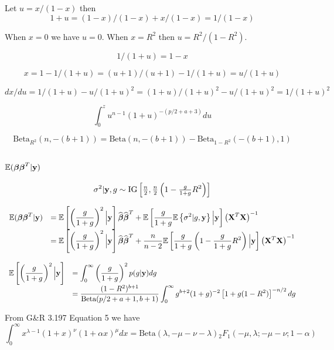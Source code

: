 \documentclass{article}
\def\vectorfontone{\bf}
\def\vectorfonttwo{\boldsymbol}
\def\vy{{\vectorfontone y}}                      %
\def\vbeta{{\vectorfonttwo \beta}}               %
\def\matrixfontone{\bf}
\def\mX{{\matrixfontone X}}                      %
\def\bE{{\mathbb E}}                             %
\def\ds{\displaystyle}
\theoremstyle{definition}
\begin{document}
Let $u = x/(1-x)$ then
$$
1 + u = (1 - x)/(1 - x) + x/(1-x) = 1/(1-x)
$$

\noindent When $x=0$ we have $u=0$. When $x=R^2$ then $u = R^2/(1-R^2)$.

$$
1/(1+u) = 1 - x
$$

$$
x = 1 -1/(1+u) = (u+1)/(u+1) -1/(1+u) = u/(1+u)
$$

$$
dx/du = 1/(1 + u) - u/(1+u)^2 = (1 + u)/(1 + u)^2 - u/(1+u)^2 = 1/(1 + u)^2
$$

$$
\int_{0}^{z} u^{n-1} (1 + u)^{-(p/2 + a + 3)}   du
$$


$$
\mbox{Beta}_{R^2}(n,-(b+1)) = \mbox{Beta}(n,-(b+1)) - \mbox{Beta}_{1-R^2}(-(b+1),1)
$$


\subsection{$\bE(\vbeta\vbeta^T|\vy)$}

$$
\sigma^2|\vy,g \sim \mbox{IG}\left[\tfrac{n}{2},\tfrac{n}{2}\left( 
1 -
\tfrac{g}{1+g} R^2\right) \right]
$$

$$
\begin{array}{rl}
\ds \bE(\vbeta\vbeta^T|\vy)
& \ds = 
\bE\left[ \left( \frac{g}{1+g} \right)^2 \Big| \vy  \right]  \widehat{\vbeta}\widehat{\vbeta}^T
+ \bE \left[ \frac{g}{1+g} \bE\left\{ \sigma^2 | g,\vy \right\} \Big|\vy \right] \left( \mX^T\mX \right)^{-1} 

\\ [2ex]

& \ds = 
\bE\left[ \left( \frac{g}{1+g} \right)^2 \Big| \vy  \right]  \widehat{\vbeta}\widehat{\vbeta}^T
+ \frac{n}{n - 2} \bE \left[ \frac{g}{1+g} \left( 
	1 -
	\frac{g}{1+g} R^2\right) \Big|\vy \right] \left( \mX^T\mX \right)^{-1} 


\end{array}
$$



$$
\begin{array}{rl}
\ds \bE\left[ \left(  \frac{g}{1+g} \right)^2  \Big| \vy \right]
& \ds = \int_0^\infty \left( \frac{g}{1+g} \right)^2 p(g|\vy) dg 

\\ [2ex]

& \ds = \frac{(1 -  R^2)^{b+1}}{\mbox{Beta}(p/2 + a + 1,b+1)} 
\int_0^\infty g^{b+2} (1 + g)^{-2} \left[  1 + g(1 -  R^2) \right]^{-n/2} dg
\end{array}
$$


\noindent From G\&R 3.197 Equation 5 we have
$$
\int_0^\infty x^{\lambda - 1} (1 + x)^{\nu}  (1 + \alpha x)^{\mu} dx
= \mbox{Beta}(\lambda,-\mu-\nu-\lambda) {}_2 F_1(-\mu,\lambda;-\mu-\nu;1-\alpha)
$$  
\end{document}
